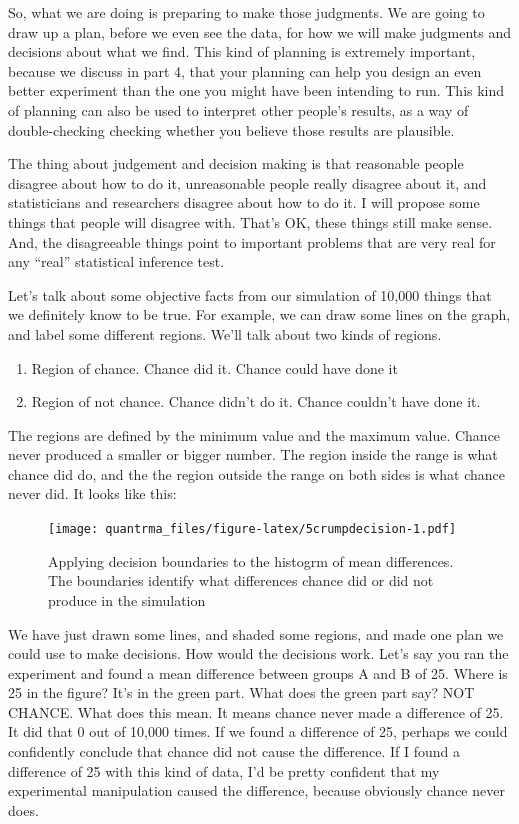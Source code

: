 \documentclass[
]{book}
\providecommand{\tightlist}{%
  \setlength{\itemsep}{0pt}\setlength{\parskip}{0pt}}
\begin{document}
So, what we are doing is preparing to make those judgments. We are going to draw up a plan, before we even see the data, for how we will make judgments and decisions about what we find. This kind of planning is extremely important, because we discuss in part 4, that your planning can help you design an even better experiment than the one you might have been intending to run. This kind of planning can also be used to interpret other people's results, as a way of double-checking checking whether you believe those results are plausible.

The thing about judgement and decision making is that reasonable people disagree about how to do it, unreasonable people really disagree about it, and statisticians and researchers disagree about how to do it. I will propose some things that people will disagree with. That's OK, these things still make sense. And, the disagreeable things point to important problems that are very real for any ``real'' statistical inference test.

Let's talk about some objective facts from our simulation of 10,000 things that we definitely know to be true. For example, we can draw some lines on the graph, and label some different regions. We'll talk about two kinds of regions.

\begin{enumerate}
\def\labelenumi{\arabic{enumi}.}
\tightlist
\item
  Region of chance. Chance did it. Chance could have done it
\item
  Region of not chance. Chance didn't do it. Chance couldn't have done it.
\end{enumerate}

The regions are defined by the minimum value and the maximum value. Chance never produced a smaller or bigger number. The region inside the range is what chance did do, and the the region outside the range on both sides is what chance never did. It looks like this:

\begin{figure}
\centering
\texttt{[image: quantrma\_files/figure-latex/5crumpdecision-1.pdf]}
\caption{\label{fig:5crumpdecision}Applying decision boundaries to the histogrm of mean differences. The boundaries identify what differences chance did or did not produce in the simulation}
\end{figure}

We have just drawn some lines, and shaded some regions, and made one plan we could use to make decisions. How would the decisions work. Let's say you ran the experiment and found a mean difference between groups A and B of 25. Where is 25 in the figure? It's in the green part. What does the green part say? NOT CHANCE. What does this mean. It means chance never made a difference of 25. It did that 0 out of 10,000 times. If we found a difference of 25, perhaps we could confidently conclude that chance did not cause the difference. If I found a difference of 25 with this kind of data, I'd be pretty confident that my experimental manipulation caused the difference, because obviously chance never does.
\end{document}
